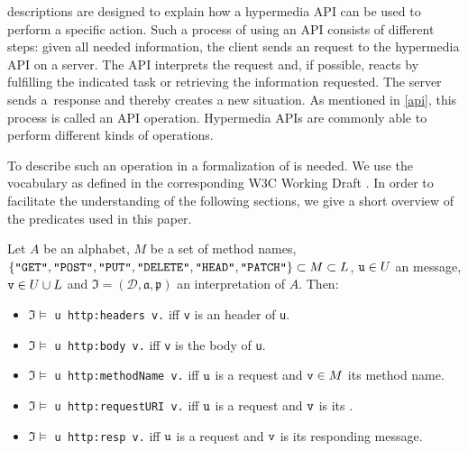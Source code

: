 \restdesc descriptions are designed to explain how a hypermedia API can be used to perform a specific action. 
Such a process of using an API consists of different steps:
given all needed information, the client sends an \http request to the hypermedia API on a server.
The API interprets the request and,
if possible, reacts by fulfilling the indicated task
or retrieving the information requested. The server sends a~response and thereby creates a new situation. As mentioned in \cref{api}, this process 
is called an API operation.
Hypermedia APIs are commonly able to perform different kinds of operations.

To describe such an operation in \nthree
a formalization of \http
is needed. 
We use the \rdf vocabulary as defined in the corresponding W3C Working Draft \cite{httprdf}.
In order to facilitate the understanding of the following sections, we give a short overview of the \http predicates used in this paper.

\begin{definition}
Let $A$ be an \nthree alphabet,
$M$ be a set of \http method names,
$\{ \texttt{"GET"},\texttt{"POST"},\texttt{"PUT"},\linebreak[1]
\texttt{"DELETE"},\texttt{"HEAD"},\texttt{"PATCH"}\}\subset M \subset L$,
$\verb!u!\in U$ an \http message,
$\verb!v!\in U\cup L$
and $\mathfrak{I}=(\mathcal{D},\mathfrak{a,p})$ an interpretation of $A$.
Then:


\begin{itemize}
 \item  $\mathfrak{I}\models$ \verb!u http:headers v.! iff \texttt{v} is an \http header of \verb!u!.
 \item $\mathfrak{I}\models$ \verb!u http:body v.! iff \verb!v! is the \http body of \verb!u!. 
  \item $\mathfrak{I}\models$ \verb!u http:methodName v.! iff $\verb!u!$ is a request and 
  $\verb!v!\in M$ its method name.
  \item $\mathfrak{I}\models$ \verb!u http:requestURI v.! iff $\verb!u!$ is a request and $\verb!v!$ is its \URL.
  \item $\mathfrak{I}\models$ \verb!u http:resp v.! iff $\verb!u!$ is a request and $\verb!v!$ is its responding \http message.
\end{itemize}
\end{definition}

